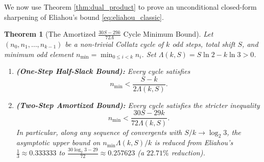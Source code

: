 \documentclass[11pt, a4paper]{amsart}
\newtheorem{theorem}{Theorem}[section]
\theoremstyle{definition}
\begin{document}
We now use Theorem \ref{thm:dual_product} to prove an unconditional closed-form sharpening of Eliahou's bound \eqref{eq:eliahou_classic}.

\begin{theorem}[The Amortized $\frac{30S - 29k}{72\Lambda}$ Cycle Minimum Bound]\label{thm:amortized_bound}
Let $(n_0, n_1, \dots, n_{k-1})$ be a non-trivial Collatz cycle of $k$ odd steps, total shift $S$, and minimum odd element $n_{\min} = \min_{0 \le i < k} n_i$. Set $\Lambda(k, S) = S \ln 2 - k \ln 3 > 0$.
\begin{enumerate}
    \item \textbf{(One-Step Half-Slack Bound):} Every cycle satisfies
    \begin{equation}\label{eq:half_slack}
    n_{\min} < \frac{S - k}{2 \Lambda(k, S)}.
    \end{equation}
    \item \textbf{(Two-Step Amortized Bound):} Every cycle satisfies the stricter inequality
    \begin{equation}\label{eq:amortized_72}
    n_{\min} < \frac{30 S - 29 k}{72 \Lambda(k, S)}.
    \end{equation}
    In particular, along any sequence of convergents with $S / k \to \log_2 3$, the asymptotic upper bound on $n_{\min} \Lambda(k, S) / k$ is reduced from Eliahou's $\frac{1}{3} \approx 0.333333$ to $\frac{30 \log_2 3 - 29}{72} \approx 0.257623$ (a $22.71\%$ reduction).
\end{enumerate}
\end{theorem}
\end{document}
